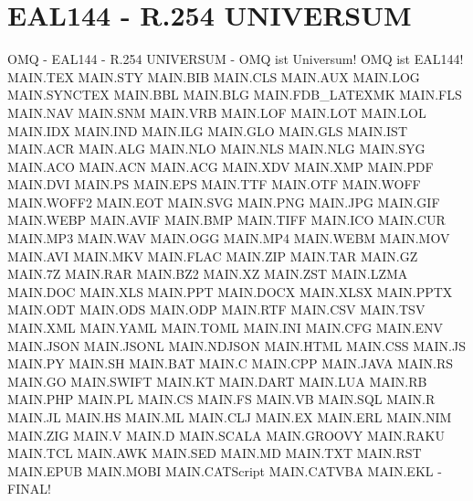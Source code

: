 \documentclass{MAIN}
\begin{document}
\section*{EAL144 - R.254 UNIVERSUM}
OMQ - EAL144 - R.254 UNIVERSUM - OMQ ist Universum! OMQ ist EAL144!
MAIN.TEX MAIN.STY MAIN.BIB MAIN.CLS MAIN.AUX MAIN.LOG MAIN.SYNCTEX MAIN.BBL MAIN.BLG MAIN.FDB_LATEXMK MAIN.FLS MAIN.NAV MAIN.SNM MAIN.VRB MAIN.LOF MAIN.LOT MAIN.LOL MAIN.IDX MAIN.IND MAIN.ILG MAIN.GLO MAIN.GLS MAIN.IST MAIN.ACR MAIN.ALG MAIN.NLO MAIN.NLS MAIN.NLG MAIN.SYG MAIN.ACO MAIN.ACN MAIN.ACG MAIN.XDV MAIN.XMP MAIN.PDF MAIN.DVI MAIN.PS MAIN.EPS MAIN.TTF MAIN.OTF MAIN.WOFF MAIN.WOFF2 MAIN.EOT MAIN.SVG MAIN.PNG MAIN.JPG MAIN.GIF MAIN.WEBP MAIN.AVIF MAIN.BMP MAIN.TIFF MAIN.ICO MAIN.CUR MAIN.MP3 MAIN.WAV MAIN.OGG MAIN.MP4 MAIN.WEBM MAIN.MOV MAIN.AVI MAIN.MKV MAIN.FLAC MAIN.ZIP MAIN.TAR MAIN.GZ MAIN.7Z MAIN.RAR MAIN.BZ2 MAIN.XZ MAIN.ZST MAIN.LZMA MAIN.DOC MAIN.XLS MAIN.PPT MAIN.DOCX MAIN.XLSX MAIN.PPTX MAIN.ODT MAIN.ODS MAIN.ODP MAIN.RTF MAIN.CSV MAIN.TSV MAIN.XML MAIN.YAML MAIN.TOML MAIN.INI MAIN.CFG MAIN.ENV MAIN.JSON MAIN.JSONL MAIN.NDJSON MAIN.HTML MAIN.CSS MAIN.JS MAIN.PY MAIN.SH MAIN.BAT MAIN.C MAIN.CPP MAIN.JAVA MAIN.RS MAIN.GO MAIN.SWIFT MAIN.KT MAIN.DART MAIN.LUA MAIN.RB MAIN.PHP MAIN.PL MAIN.CS MAIN.FS MAIN.VB MAIN.SQL MAIN.R MAIN.JL MAIN.HS MAIN.ML MAIN.CLJ MAIN.EX MAIN.ERL MAIN.NIM MAIN.ZIG MAIN.V MAIN.D MAIN.SCALA MAIN.GROOVY MAIN.RAKU MAIN.TCL MAIN.AWK MAIN.SED MAIN.MD MAIN.TXT MAIN.RST MAIN.EPUB MAIN.MOBI MAIN.CATScript MAIN.CATVBA MAIN.EKL - FINAL!
\end{document}

